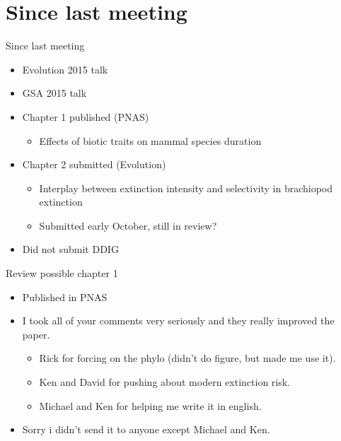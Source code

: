 \documentclass{beamer}
\title{}
\author{Peter D Smits}
\institute{Committee on Evolutionary Biology, University of Chicago}
\date{}
\begin{document}
\begin{frame}
  \tableofcontents
\end{frame}

\section{Since last meeting}
\begin{frame}
  \begin{alertblock}{Since last meeting}
    \begin{itemize}
      \item Evolution 2015 talk
      \item GSA 2015 talk
      \item Chapter 1 published (PNAS)
        \begin{itemize}
          \item Effects of biotic traits on mammal species duration
        \end{itemize}
      \item Chapter 2 submitted (Evolution)
        \begin{itemize}
          \item Interplay between extinction intensity and selectivity in brachiopod extinction
          \item Submitted early October, still in review?
        \end{itemize}
      \item Did not submit DDIG
    \end{itemize}
  \end{alertblock}
\end{frame}


\begin{frame}
  \begin{block}{Review possible chapter 1}
    \begin{itemize}
      \item Published in PNAS
      \item I took all of your comments very seriously and they really improved the paper.
        \begin{itemize}
          \item Rick for forcing on the phylo (didn't do figure, but made me use it).
          \item Ken and David for pushing about modern extinction risk.
          \item Michael and Ken for helping me write it in english.
        \end{itemize}
      \item Sorry i didn't send it to anyone except Michael and Ken.
    \end{itemize}
  \end{block}
\end{frame}
\end{document}
